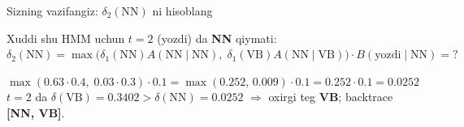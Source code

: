 \documentclass[aspectratio=169,11pt]{beamer}
\begin{document}
\begin{frame}{Sizning vazifangiz: $\delta_2(\text{NN})$ ni hisoblang}
  \begin{tcolorbox}[warnbox,title=Savol --- 2 daqiqa]
    \small
    Xuddi shu HMM uchun $t{=}2$ (yozdi) da \textbf{NN} qiymati:\\[4pt]
    \textbf{\large $\delta_2(\text{NN}) = \max\big(\delta_1(\text{NN})A(\text{NN}{\mid}\text{NN}),\;
    \delta_1(\text{VB})A(\text{NN}{\mid}\text{VB})\big)\cdot B(\text{yozdi}{\mid}\text{NN}) = ?$}
  \end{tcolorbox}
  \pause
  \begin{tcolorbox}[okbox,title=Javob]
    \small
    $\max(0.63{\cdot}0.4,\; 0.03{\cdot}0.3)\cdot 0.1
      = \max(0.252,\,0.009)\cdot 0.1 = 0.252\cdot 0.1 = \mathbf{0.0252}$\\[3pt]
    $t{=}2$ da $\delta(\text{VB})=0.3402 > \delta(\text{NN})=0.0252$ $\Rightarrow$
    oxirgi teg \textbf{VB}; backtrace \textbf{[NN, VB]}.
  \end{tcolorbox}
\end{frame}
\end{document}
